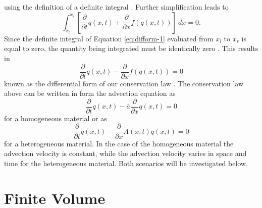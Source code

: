 \documentclass[review,onefignum,onetabnum]{siamart171218}
\begin{document}
using the definition of a definite integral \cite{leveque_2002}. Further simplification leads to 
\begin{equation}
    \int_{x_l}^{x_r} \left[ \frac{\partial}{\partial t} q(x,t) +  \frac{\partial}{\partial x }  f(q(x,t)) \right] \: dx = 0.
    \label{eq:difform-1}
\end{equation}
Since the definite integral of Equation \ref{eq:difform-1} evaluated from $x_l$ to $x_r$ is equal to zero, the quantity being integrated must be identically zero \cite{leveque_2002}. This results in
\begin{equation}
    \frac{\partial}{\partial t} q(x,t) -  \frac{\partial}{\partial x}f(q(x,t)) = 0 
\end{equation}
known as the differential form of our conservation law \cite{leveque_2002}. The conservation law above can be written in form the advection equation as 
\begin{equation}
        \frac{\partial}{\partial t} q(x,t) -  \bar a \frac{\partial}{\partial x}q(x,t) = 0 
        \label{eq:homoadvection}
\end{equation}
for a homogeneous material or as
\begin{equation}
        \frac{\partial}{\partial t} q(x,t) -  \frac{\partial}{\partial x}A(x,t) q(x,t) = 0 
\end{equation}
for a heterogeneous material. In the case of the homogeneous material the advection velocity is constant, while the advection velocity varies in space and time for the heterogeneous material. Both scenarios will be investigated below. 


\section{Finite Volume}
\end{document}
